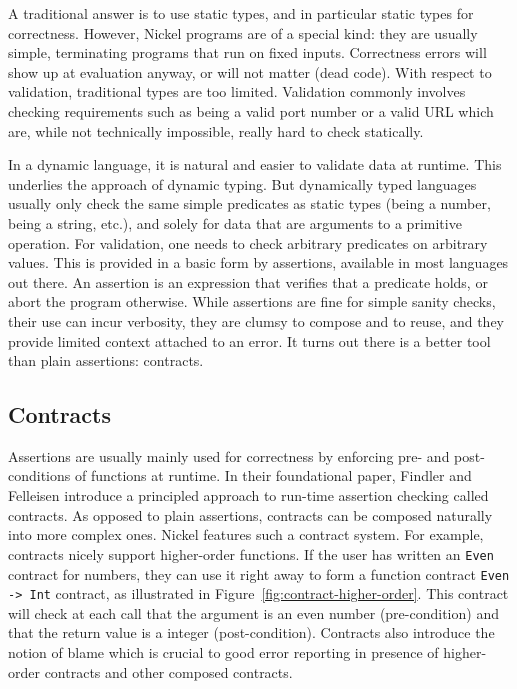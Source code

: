 \documentclass[sigplan,10pt,review,anonymous]{acmart}
\newcommand{\nickel}[1]{\lstinline[language=nickel]{#1}}
\begin{document}
A traditional answer is to use static types, and in particular static types for
correctness. However, Nickel programs are of a special kind: they are usually
simple, terminating programs that run on fixed inputs. Correctness errors will
show up at evaluation anyway, or will not matter (dead code). With respect to
validation, traditional types are too limited. Validation commonly involves
checking requirements such as being a valid port number or a valid URL which
are, while not technically impossible, really hard to check statically.

In a dynamic language, it is natural and easier to validate data at runtime.
This underlies the approach of dynamic typing. But dynamically typed languages
usually only check the same simple predicates as static types (being a number,
being a string, etc.), and solely for data that are arguments to a primitive
operation. For validation, one needs to check arbitrary predicates on arbitrary
values. This is provided in a basic form by assertions, available in most
languages out there. An assertion is an expression that verifies that a
predicate holds, or abort the program otherwise.  While assertions are fine for
simple sanity checks, their use can incur verbosity, they are clumsy to compose
and to reuse, and they provide limited context attached to an error. It turns
out there is a better tool than plain assertions: contracts.

\subsection*{Contracts}

Assertions are usually mainly used for correctness by enforcing pre- and
post-conditions of functions at runtime. In their foundational
paper\cite{FindlerFelleisenHOContracts}, Findler and Felleisen introduce a
principled approach to run-time assertion checking called contracts. As opposed
to plain assertions, contracts can be composed naturally into more complex ones.
Nickel features such a contract system. For example, contracts nicely support
higher-order functions. If the user has written an \nickel{Even} contract for
numbers, they can use it right away to form a function contract \nickel{Even ->
Int} contract, as illustrated in Figure~\ref{fig:contract-higher-order}. This
contract will check at each call that the argument is an even number
(pre-condition) and that the return value is a integer (post-condition).
Contracts also introduce the notion of blame which is crucial to good error
reporting in presence of higher-order contracts and other composed contracts.
\end{document}
